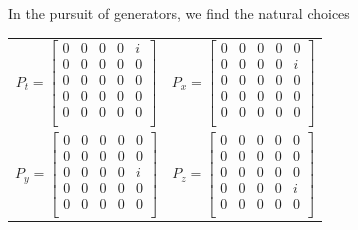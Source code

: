 \documentclass[compress,aspectratio=169,10pt,usenames,dvipsnames]{beamer}
\begin{document}
\begin{frame}
\vfill
In the pursuit of generators, we find the natural choices
\vfill
\begin{center}
\begin{tabular}{cc}
	$P_t = \begin{bmatrix}
				0 & 0 & 0 & 0 & i \\
				0 & 0 & 0 & 0 & 0\\
				0 & 0 & 0 & 0 & 0\\
				0 & 0 & 0 & 0 & 0\\
				0 & 0 & 0 & 0 & 0\\
			\end{bmatrix}$ &
	$P_x = \begin{bmatrix}
				0 & 0 & 0 & 0 & 0 \\
				0 & 0 & 0 & 0 & i\\
				0 & 0 & 0 & 0 & 0\\
				0 & 0 & 0 & 0 & 0\\
				0 & 0 & 0 & 0 & 0\\
			\end{bmatrix}$ \\
	$P_y = \begin{bmatrix}
				0 & 0 & 0 & 0 & 0 \\
				0 & 0 & 0 & 0 & 0\\
				0 & 0 & 0 & 0 & i\\
				0 & 0 & 0 & 0 & 0\\
				0 & 0 & 0 & 0 & 0\\
			\end{bmatrix}$ &
	$P_z = \begin{bmatrix}
				0 & 0 & 0 & 0 & 0 \\
				0 & 0 & 0 & 0 & 0\\
				0 & 0 & 0 & 0 & 0\\
				0 & 0 & 0 & 0 & i\\
				0 & 0 & 0 & 0 & 0\\
			\end{bmatrix}$
\end{tabular}
\end{center}
\vfill
\end{frame}
\end{document}
